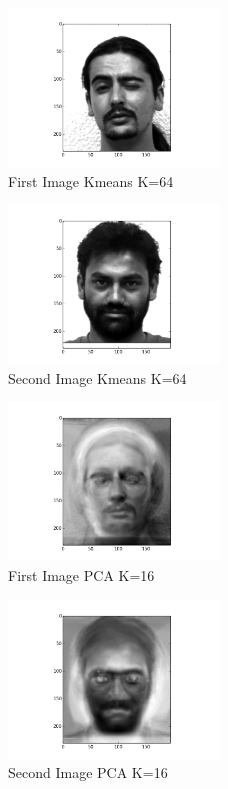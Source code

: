 \documentclass[conference]{IEEEtran}
\begin{document}
    \begin{figure}[htbp]
        \centerline{\includegraphics[width=0.5\textwidth]{kmeans64-1.png}}
        \caption{First Image Kmeans K=64}
    \end{figure}

    \begin{figure}[htbp]
        \centerline{\includegraphics[width=0.5\textwidth]{kmeans64-2.png}}
        \caption{Second Image Kmeans K=64}
    \end{figure}

    \begin{figure}[htbp]
        \centerline{\includegraphics[width=0.5\textwidth]{pca16-1.png}}
        \caption{First Image PCA K=16}
    \end{figure}

    \begin{figure}[htbp]
        \centerline{\includegraphics[width=0.5\textwidth]{pca16-2.png}}
        \caption{Second Image PCA K=16}
    \end{figure}
\end{document}
